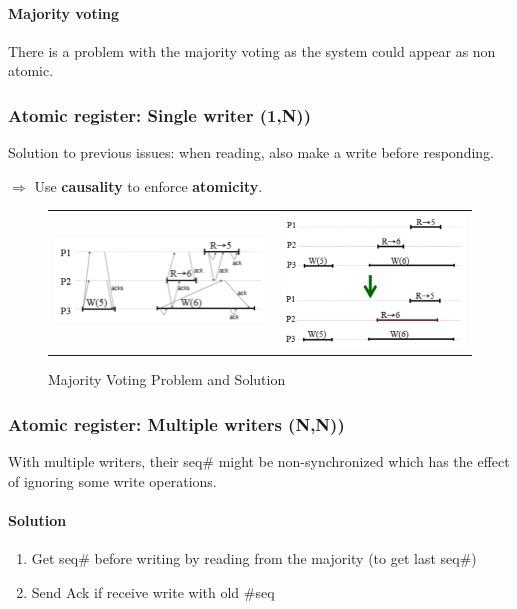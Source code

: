 \paragraph{Majority voting}
There is a problem with the majority voting as the system could appear
as non atomic.

\subsubsection{Atomic register: Single writer (1,N))}

Solution to previous issues: when reading, also make a write before responding.

$\Rightarrow$ Use \textbf{causality} to enforce \textbf{atomicity}.

\begin{figure}[!ht]
    \centering
    \begin{tabular}{m{7cm}m{7cm}}
		\includegraphics[width=7cm]{img/maj_prob.png}&
		\includegraphics[width=6cm]{img/maj_sol.png}
	\end{tabular}
		\caption{Majority Voting Problem and Solution}
\end{figure}
\FloatBarrier{}

\subsubsection{Atomic register: Multiple writers (N,N))}

With multiple writers, their seq\# might be non-synchronized
which has the effect of ignoring some write operations.

\paragraph{Solution}
\begin{enumerate}
	\item Get seq\# before writing by reading from
	the majority (to get last seq\#)
	\item Send Ack if receive write with old \#seq
\end{enumerate}

